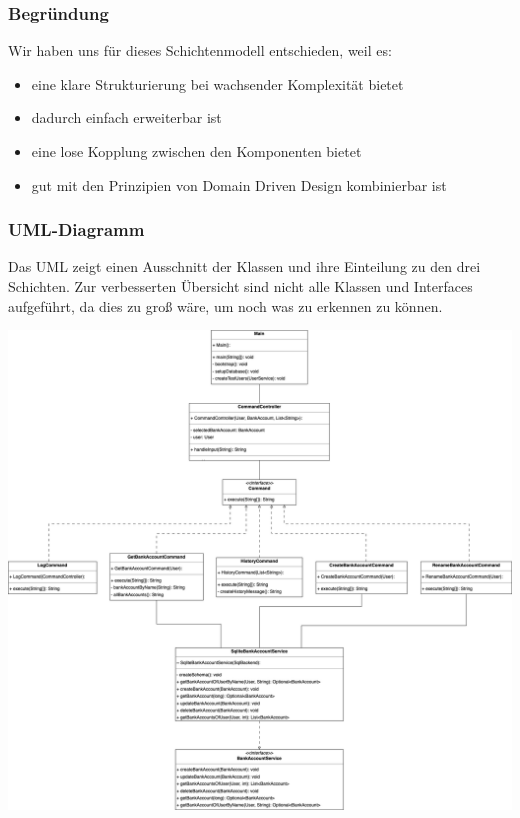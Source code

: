 \subsubsection*{Begründung}
Wir haben uns für dieses Schichtenmodell entschieden, weil es:
\begin{itemize}
    \item eine klare Strukturierung bei wachsender Komplexität bietet
    \item dadurch einfach erweiterbar ist
    \item eine lose Kopplung zwischen den Komponenten bietet
    \item gut mit den Prinzipien von Domain Driven Design kombinierbar ist
\end{itemize}

\subsubsection*{UML-Diagramm}

Das UML zeigt einen Ausschnitt der Klassen und ihre Einteilung zu den drei Schichten.
Zur verbesserten Übersicht sind nicht alle Klassen und Interfaces aufgeführt, da dies zu groß wäre, um noch was zu erkennen zu können.

\includegraphics[width=\linewidth]{kapitel2_architektur/SoftwareArchitektur2.drawio.png}



